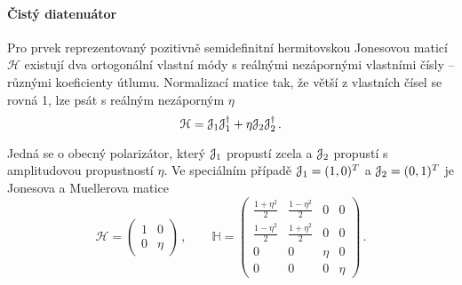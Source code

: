 \paragraph{Čistý diatenuátor}

Pro prvek reprezentovaný pozitivně semidefinitní hermitovskou Jonesovou maticí $\mathcal{H}$ existují dva ortogonální vlastní módy s reálnými nezápornými vlastními čísly -- různými koeficienty útlumu.
Normalizací matice tak, že větší z vlastních čísel se rovná 1, lze psát s reálným nezáporným $\eta$
\begin{equation}
    \mathcal{H}=\mathcal{J}_1 \mathcal{J}_1^\dagger + \eta \mathcal{J}_2 \mathcal{J}_2^\dagger \,.
\end{equation}

Jedná se o obecný polarizátor, který $\mathcal{J}_1$ propustí zcela a $\mathcal{J}_2$ propustí s amplitudovou propustností $\eta$.
Ve speciálním případě $\mathcal{J}_1=(1,0)^T$ a $\mathcal{J}_2=(0,1)^T$ je Jonesova a Muellerova matice
\begin{equation}
    \mathcal{H}=\begin{pmatrix}
        1 & 0 \\ 0 & \eta
        \end{pmatrix} \,, \qquad
    \mathbb{H}=\begin{pmatrix}
        \frac{1+\eta^2}{2} & \frac{1-\eta^2}{2} & 0 & 0 \\ \frac{1-\eta^2}{2} & \frac{1+\eta^2}{2} & 0 & 0 \\
        0 & 0 & \eta & 0 \\ 0 & 0 & 0 & \eta
        \end{pmatrix} \,.
\end{equation}

